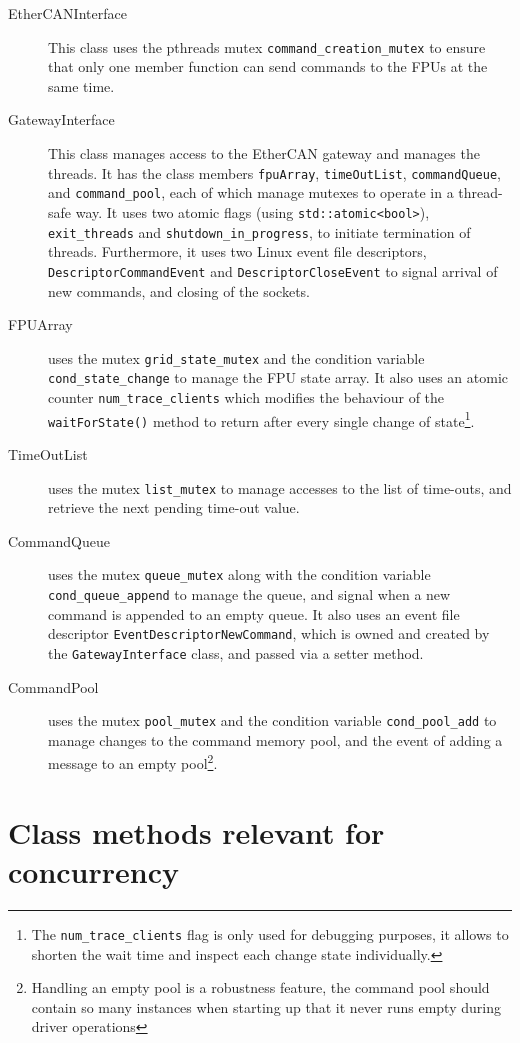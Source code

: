 \documentclass[fontsize=12,a4paper]{scrartcl}
\begin{document}
\begin{description}
\item[EtherCANInterface] This class uses the pthreads mutex
  \texttt{command\_creation\_mutex} to ensure that only one member
  function can send commands to the FPUs at the same time.
\item[GatewayInterface] This class manages access to the EtherCAN
  gateway and manages the threads.  It has the class members
  \texttt{fpuArray}, \texttt{timeOutList}, \texttt{commandQueue}, and
  \texttt{command\_pool}, each of which manage mutexes to operate in a
  thread-safe way. It uses two atomic flags (using
  \texttt{std::atomic<bool>}), \texttt{exit\_threads} and
  \texttt{shutdown\_in\_progress}, to initiate termination of threads.
  Furthermore, it uses two Linux event file descriptors,
  \texttt{DescriptorCommandEvent} and \texttt{DescriptorCloseEvent} to
  signal arrival of new commands, and closing of the sockets.

\item[FPUArray] uses the mutex \texttt{grid\_state\_mutex} and the
  condition variable \texttt{cond\_state\_change} to manage the FPU
  state array. It also uses an atomic counter
  \texttt{num\_trace\_clients} which modifies the behaviour of the
  \texttt{waitForState()} method to return after every single change
  of state\footnote{The \texttt{num\_trace\_clients} flag is only used
    for debugging purposes, it allows to shorten the wait time and
    inspect each change state individually.}.
\item[TimeOutList] uses the mutex \texttt{list\_mutex} to manage
  accesses to the list of time-outs, and retrieve the next pending
  time-out value.
\item[CommandQueue] uses the mutex \texttt{queue\_mutex} along with
  the condition variable \texttt{cond\_queue\_append} to manage the
  queue, and signal when a new command is appended to an empty queue.
  It also uses an event file descriptor
  \texttt{EventDescriptorNewCommand}, which is owned and created by
  the \texttt{GatewayInterface} class, and passed via a setter method.
\item[CommandPool] uses the mutex \texttt{pool\_mutex} and the
  condition variable \texttt{cond\_pool\_add} to manage changes to the
  command memory pool, and the event of adding a message to an empty
  pool\footnote{Handling an empty pool is a robustness feature, the
    command pool should contain so many instances when starting up
    that it never runs empty during driver operations}.
\end{description}

\appendix

\section{Class methods relevant for concurrency}


\end{document}
